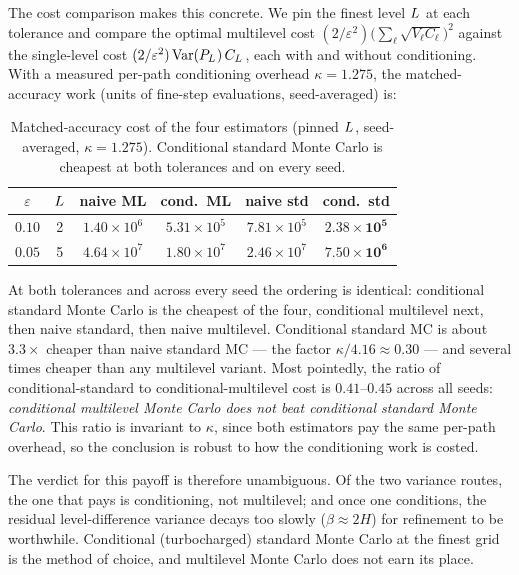 \documentclass[11pt]{article}
\begin{document}
The cost comparison makes this concrete. We pin the finest level $L^{\*}$ at each tolerance
and compare the optimal multilevel cost
$(2/\varepsilon^2)\big(\sum_\ell\sqrt{V_\ell C_\ell}\big)^2$ against the single-level cost
$(2/\varepsilon^2)\operatorname{Var}(P_{L^{\*}})\,C_{L^{\*}}$, each with and without
conditioning. With a measured per-path conditioning overhead $\kappa=1.275$, the
matched-accuracy work (units of fine-step evaluations, seed-averaged) is:

\begin{table}[h]
\centering
\caption{Matched-accuracy cost of the four estimators (pinned $L^{\*}$, seed-averaged,
$\kappa=1.275$). Conditional standard Monte Carlo is cheapest at both tolerances and on every
seed.}
\label{tab:fourway}
\begin{tabular}{cccccc}
\toprule
$\varepsilon$ & $L^{\*}$ & naive ML & cond.\ ML & naive std & cond.\ std \\
\midrule
$0.10$ & 2 & $1.40\times10^{6}$ & $5.31\times10^{5}$ & $7.81\times10^{5}$ & $\mathbf{2.38\times10^{5}}$ \\
$0.05$ & 5 & $4.64\times10^{7}$ & $1.80\times10^{7}$ & $2.46\times10^{7}$ & $\mathbf{7.50\times10^{6}}$ \\
\bottomrule
\end{tabular}
\end{table}

At both tolerances and across every seed the ordering is identical: conditional standard
Monte Carlo is the cheapest of the four, conditional multilevel next, then naive standard,
then naive multilevel. Conditional standard MC is about $3.3\times$ cheaper than naive
standard MC --- the factor $\kappa/4.16\approx0.30$ --- and several times cheaper than any
multilevel variant. Most pointedly, the ratio of conditional-standard to
conditional-multilevel cost is $0.41$--$0.45$ across all seeds: \emph{conditional multilevel
Monte Carlo does not beat conditional standard Monte Carlo}. This ratio is invariant to
$\kappa$, since both estimators pay the same per-path overhead, so the conclusion is robust
to how the conditioning work is costed.

The verdict for this payoff is therefore unambiguous. Of the two variance routes, the one
that pays is conditioning, not multilevel; and once one conditions, the residual
level-difference variance decays too slowly ($\beta\approx2H$) for refinement to be
worthwhile. Conditional (turbocharged) standard Monte Carlo at the finest grid is the method
of choice, and multilevel Monte Carlo does not earn its place.
\end{document}

